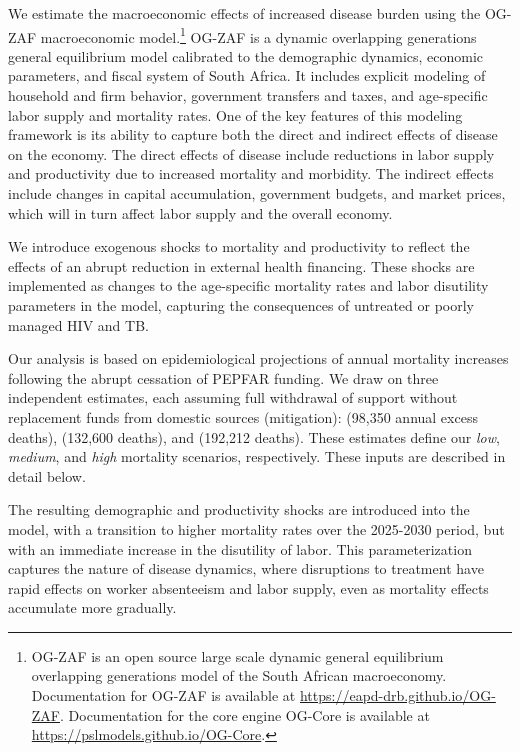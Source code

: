 \documentclass[letterpaper,12pt]{article}
\theoremstyle{definition}
\begin{document}
\begin{spacing}{1.5}
We estimate the macroeconomic effects of increased disease burden using the OG-ZAF macroeconomic model.\footnote{OG-ZAF is an open source large scale dynamic general equilibrium overlapping generations model of the South African macroeconomy. Documentation for OG-ZAF is available at \href{https://eapd-drb.github.io/OG-ZAF}{https://eapd-drb.github.io/OG-ZAF}.  Documentation for the core engine OG-Core is available at \href{https://pslmodels.github.io/OG-Core}{https://pslmodels.github.io/OG-Core}.} OG-ZAF is a dynamic overlapping generations general equilibrium model calibrated to the demographic dynamics, economic parameters, and fiscal system of South Africa. It includes explicit modeling of household and firm behavior, government transfers and taxes, and age-specific labor supply and mortality rates. One of the key features of this modeling framework is its ability to capture both the direct and indirect effects of disease on the economy. The direct effects of disease include reductions in labor supply and productivity due to increased mortality and morbidity. The indirect effects include changes in capital accumulation, government budgets, and market prices, which will in turn affect labor supply and the overall economy.

We introduce exogenous shocks to mortality and productivity to reflect the effects of an abrupt reduction in external health financing. These shocks are implemented as changes to the age-specific mortality rates and labor disutility parameters in the model, capturing the consequences of untreated or poorly managed HIV and TB.

Our analysis is based on epidemiological projections of annual mortality increases following the abrupt cessation of PEPFAR funding. We draw on three independent estimates, each assuming full withdrawal of support without replacement funds from domestic sources (mitigation): \citet{Brink2025} (98,350 annual excess deaths), \citet{Gandhi2025} (132,600 deaths), and \citet{KS2025} (192,212 deaths). These estimates define our \textit{low}, \textit{medium}, and \textit{high} mortality scenarios, respectively. These inputs are described in detail below.

The resulting demographic and productivity shocks are introduced into the model, with a transition to higher mortality rates over the 2025-2030 period, but with an immediate increase in the disutility of labor. This parameterization captures the nature of disease dynamics, where disruptions to treatment have rapid effects on worker absenteeism and labor supply, even as mortality effects accumulate more gradually.



\end{spacing}
\end{document}
